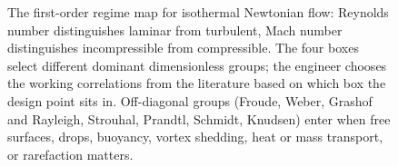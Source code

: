 \begin{figure}[htbp]
\begin{tikzpicture}
\end{tikzpicture}
\caption[Flow regimes by Re and Ma]{The first-order regime map for
isothermal Newtonian flow: Reynolds number distinguishes laminar
from turbulent, Mach number distinguishes incompressible from
compressible. The four boxes select different dominant dimensionless
groups; the engineer chooses the working correlations from the
literature based on which box the design point sits in. Off-diagonal
groups (Froude, Weber, Grashof and Rayleigh, Strouhal, Prandtl,
Schmidt, Knudsen) enter when free surfaces, drops, buoyancy, vortex
shedding, heat or mass transport, or rarefaction matters.}
\label{fig:vol01:ch02:flow-regimes}
\end{figure}
